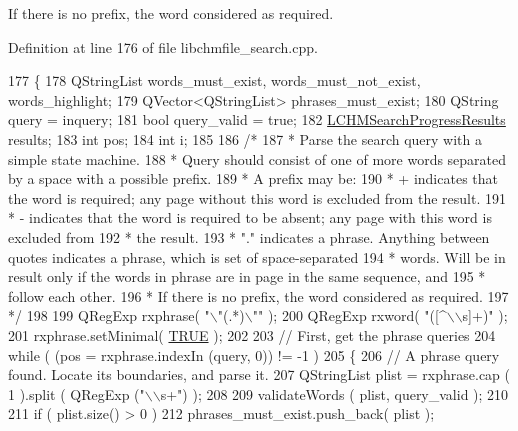 If there is no prefix, the word considered as required. 

Definition at line 176 of file libchmfile\+\_\+search.\+cpp.


\begin{DoxyCode}
177 \{
178     QStringList words\_must\_exist, words\_must\_not\_exist, words\_highlight;
179     QVector<QStringList> phrases\_must\_exist;
180     QString query = inquery;
181     \textcolor{keywordtype}{bool} query\_valid = \textcolor{keyword}{true};
182     \hyperlink{libchmfileimpl_8h_a49915bbafbeae4acb86601a1e4f0c247}{LCHMSearchProgressResults} results;
183     \textcolor{keywordtype}{int} pos;
184     \textcolor{keywordtype}{int} i;  
185         
186     \textcolor{comment}{/*}
187 \textcolor{comment}{    * Parse the search query with a simple state machine.}
188 \textcolor{comment}{    * Query should consist of one of more words separated by a space with a possible prefix.}
189 \textcolor{comment}{     * A prefix may be:}
190 \textcolor{comment}{    *   +   indicates that the word is required; any page without this word is excluded from the result.}
191 \textcolor{comment}{    *   -   indicates that the word is required to be absent; any page with this word is excluded from}
192 \textcolor{comment}{    *       the result.}
193 \textcolor{comment}{    *   "." indicates a phrase. Anything between quotes indicates a phrase, which is set of space-separated}
194 \textcolor{comment}{    *       words. Will be in result only if the words in phrase are in page in the same sequence, and}
195 \textcolor{comment}{    *       follow each other.}
196 \textcolor{comment}{    *   If there is no prefix, the word considered as required.}
197 \textcolor{comment}{    */}
198     
199     QRegExp rxphrase( \textcolor{stringliteral}{"\(\backslash\)"(.*)\(\backslash\)""} );
200     QRegExp rxword( \textcolor{stringliteral}{"([^\(\backslash\)\(\backslash\)s]+)"} );
201     rxphrase.setMinimal( \hyperlink{unpluckint_8h_aa8cecfc5c5c054d2875c03e77b7be15d}{TRUE} );
202 
203     \textcolor{comment}{// First, get the phrase queries}
204     \textcolor{keywordflow}{while} ( (pos = rxphrase.indexIn (query, 0)) != -1 )
205     \{
206         \textcolor{comment}{// A phrase query found. Locate its boundaries, and parse it.}
207         QStringList plist = rxphrase.cap ( 1 ).split ( QRegExp (\textcolor{stringliteral}{"\(\backslash\)\(\backslash\)s+"}) );
208         
209         validateWords ( plist, query\_valid );
210         
211         \textcolor{keywordflow}{if} ( plist.size() > 0 )
212             phrases\_must\_exist.push\_back( plist );

\end{DoxyCode}

